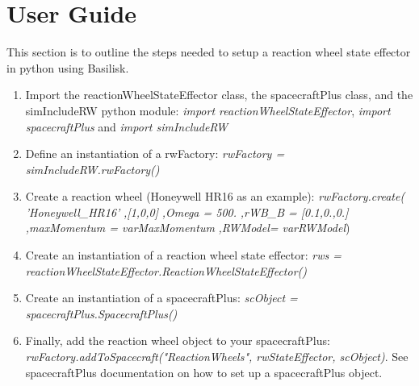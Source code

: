 \section{User Guide}

This section is to outline the steps needed to setup a reaction wheel state effector in python using Basilisk.

\begin{enumerate}
	\item Import the reactionWheelStateEffector class, the spacecraftPlus class, and the simIncludeRW python module: \newline \textit{import reactionWheelStateEffector}, \textit{import spacecraftPlus} and \textit{import simIncludeRW}
	\item Define an instantiation of a rwFactory: \newline
	\textit{rwFactory = simIncludeRW.rwFactory()}
	\item Create a reaction wheel (Honeywell HR16 as an example): \newline \textit{rwFactory.create(} \newline
		\textit{'Honeywell\_HR16'} \newline
		\textit{,[1,0,0]} \newline
		\textit{,Omega = 500.} \newline
		\textit{,rWB\_B = [0.1,0.,0.]} \newline
		\textit{,maxMomentum = varMaxMomentum} \newline
		\textit{,RWModel= varRWModel})
	\item Create an instantiation of a reaction wheel state effector: \newline \textit{rws = reactionWheelStateEffector.ReactionWheelStateEffector()}
	\item Create an instantiation of a spacecraftPlus: \newline
	\textit{scObject = spacecraftPlus.SpacecraftPlus()}
	\item Finally, add the reaction wheel object to your spacecraftPlus:\newline
	\textit{rwFactory.addToSpacecraft("ReactionWheels", rwStateEffector, scObject)}. See spacecraftPlus documentation on how to set up a spacecraftPlus object. 
\end{enumerate}
